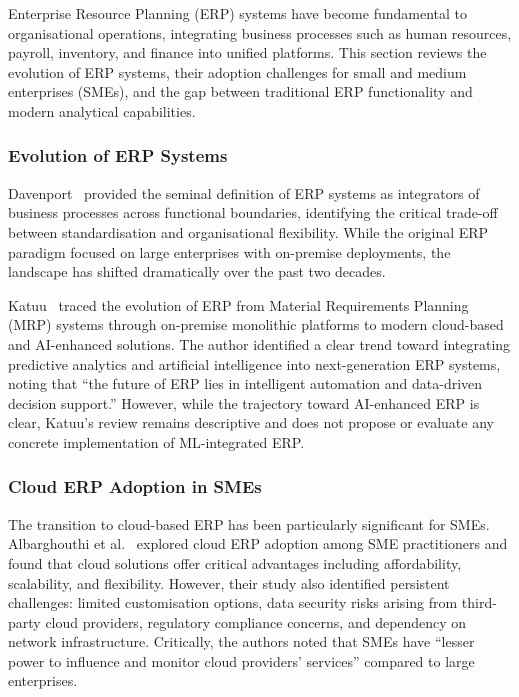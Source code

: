 \documentclass[12pt,a4paper]{article}
\begin{document}
Enterprise Resource Planning (ERP) systems have become fundamental to organisational operations, integrating business processes such as human resources, payroll, inventory, and finance into unified platforms. This section reviews the evolution of ERP systems, their adoption challenges for small and medium enterprises (SMEs), and the gap between traditional ERP functionality and modern analytical capabilities.

\subsubsection{Evolution of ERP Systems}

Davenport~\cite{davenport1998erp} provided the seminal definition of ERP systems as integrators of business processes across functional boundaries, identifying the critical trade-off between standardisation and organisational flexibility. While the original ERP paradigm focused on large enterprises with on-premise deployments, the landscape has shifted dramatically over the past two decades.

Katuu~\cite{katuu2020erp} traced the evolution of ERP from Material Requirements Planning (MRP) systems through on-premise monolithic platforms to modern cloud-based and AI-enhanced solutions. The author identified a clear trend toward integrating predictive analytics and artificial intelligence into next-generation ERP systems, noting that ``the future of ERP lies in intelligent automation and data-driven decision support.'' However, while the trajectory toward AI-enhanced ERP is clear, Katuu's review remains descriptive and does not propose or evaluate any concrete implementation of ML-integrated ERP.

\subsubsection{Cloud ERP Adoption in SMEs}

The transition to cloud-based ERP has been particularly significant for SMEs. Albarghouthi et al.~\cite{albarghouthi2024cloud} explored cloud ERP adoption among SME practitioners and found that cloud solutions offer critical advantages including affordability, scalability, and flexibility. However, their study also identified persistent challenges: limited customisation options, data security risks arising from third-party cloud providers, regulatory compliance concerns, and dependency on network infrastructure. Critically, the authors noted that SMEs have ``lesser power to influence and monitor cloud providers' services'' compared to large enterprises.
\end{document}
